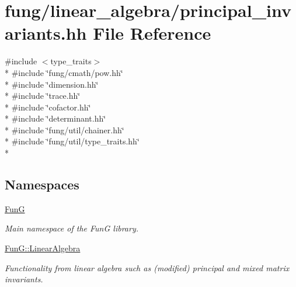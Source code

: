 \hypertarget{principal__invariants_8hh}{}\section{fung/linear\+\_\+algebra/principal\+\_\+invariants.hh File Reference}
\label{principal__invariants_8hh}
{\ttfamily \#include $<$type\+\_\+traits$>$}\\*
{\ttfamily \#include \char`\"{}fung/cmath/pow.\+hh\char`\"{}}\\*
{\ttfamily \#include \char`\"{}dimension.\+hh\char`\"{}}\\*
{\ttfamily \#include \char`\"{}trace.\+hh\char`\"{}}\\*
{\ttfamily \#include \char`\"{}cofactor.\+hh\char`\"{}}\\*
{\ttfamily \#include \char`\"{}determinant.\+hh\char`\"{}}\\*
{\ttfamily \#include \char`\"{}fung/util/chainer.\+hh\char`\"{}}\\*
{\ttfamily \#include \char`\"{}fung/util/type\+\_\+traits.\+hh\char`\"{}}\\*
\subsection*{Namespaces}
\begin{DoxyCompactItemize}
\item 
 \hyperlink{namespaceFunG}{Fun\+G}
\begin{DoxyCompactList}\small\item\em Main namespace of the Fun\+G library. \end{DoxyCompactList}\item 
 \hyperlink{namespaceFunG_1_1LinearAlgebra}{Fun\+G\+::\+Linear\+Algebra}
\begin{DoxyCompactList}\small\item\em Functionality from linear algebra such as (modified) principal and mixed matrix invariants. \end{DoxyCompactList}\end{DoxyCompactItemize}
